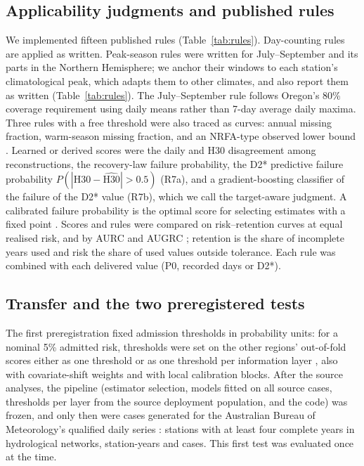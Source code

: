 \documentclass[draft]{agujournal2025}
\begin{document}
\subsection{Applicability judgments and published rules}
We implemented fifteen published rules (Table~\ref{tab:rules}). Day-counting rules are applied as written. Peak-season rules were written for July--September and its parts in the Northern Hemisphere; we anchor their windows to each station's climatological peak, which adapts them to other climates, and also report them as written (Table~\ref{tab:rules}). The July--September rule follows Oregon's 80\% coverage requirement using daily means rather than 7-day average daily maxima. Three rules with a free threshold were also traced as curves: annual missing fraction, warm-season missing fraction, and an NRFA-type observed lower bound \cite{nrfa2026}. Learned or derived scores were the daily and H30 disagreement among reconstructions, the recovery-law failure probability, the D2* predictive failure probability $P(|\mathrm{H30}-\hat{\mathrm{H30}}|>0.5)$ (R7a), and a gradient-boosting classifier of the failure of the D2* value (R7b), which we call the target-aware judgment. A calibrated failure probability is the optimal score for selecting estimates with a fixed point \cite{chow1970,franc2023}. Scores and rules were compared on risk--retention curves at equal realised risk, and by AURC and AUGRC \cite{geifman2017,traub2024}; retention is the share of incomplete years used and risk the share of used values outside tolerance. Each rule was combined with each delivered value (P0, recorded days or D2*).



\subsection{Transfer and the two preregistered tests}
\label{sec:tests}
The first preregistration fixed admission thresholds in probability units: for a nominal 5\% admitted risk, thresholds were set on the other regions' out-of-fold scores either as one threshold or as one threshold per information layer \cite{vovk2005}, also with covariate-shift weights \cite{tibshirani2019} and with local calibration blocks. After the source analyses, the pipeline (estimator selection, models fitted on all source cases, thresholds per layer from the source deployment population, and the code) was frozen, and only then were cases generated for the Australian Bureau of Meteorology's qualified daily series \cite{bom2026}: \TAuStations{} stations with at least four complete years in \TAuNetworks{} hydrological networks, \TAuYears{} station-years and \TAuCases{} cases. This first test was evaluated once at the time.
\end{document}
